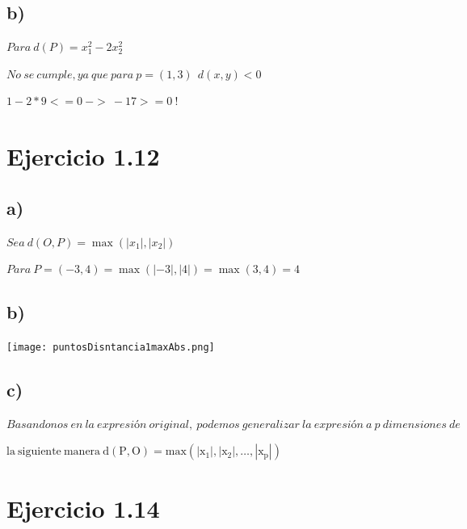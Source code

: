 \documentclass[
]{article}
\begin{document}
\hypertarget{b-4}{%
\subsection{b)}\label{b-4}}

\(Para\ d(P)=x^2_1-2x_2^2\ \)

\(No\ se\ cumple,ya\ que\ para\ p=\left(1,3\right)\ \ d\left(x,y\right)<0\)

\(1-2\ast9<=0 \  ->\  -17>=0\ !\)

\hypertarget{ejercicio-1.12}{%
\section{Ejercicio 1.12}\label{ejercicio-1.12}}

\hypertarget{a-5}{%
\subsection{a)}\label{a-5}}

\(Sea\ d\left(O,P\right)=\max{\left(\left|x_1\right|,\left|x_2\right|\right)}\)

\(Para\ P=\left(-3,4\right)=\max{\left(\left|-3\right|,\left|4\right|\right)}=\max{\left(3,4\right)}=4\)

\hypertarget{b-5}{%
\subsection{b)}\label{b-5}}

\texttt{[image: puntosDisntancia1maxAbs.png]}

\hypertarget{c-2}{%
\subsection{c)}\label{c-2}}

\(Basandonos\ en\ la\ expresión\ original,\ podemos\ generalizar\ la\ expresión\ a\ p\ dimensiones\ de\ \)

\(\mathrm{la\ siguiente\ manera\ d}\left(\mathrm{P,O}\right)\mathrm{\mathrm{=}}\mathrm{max}{\left(\left|\mathrm{x}_\mathrm{1}\right|\mathrm{,} \left|\mathrm{x}_\mathrm{2}\right|\mathrm{,\ldots,} \left|\mathrm{x}_\mathrm{p}\right|\right)}\)

\hypertarget{ejercicio-1.14}{%
\section{Ejercicio 1.14}\label{ejercicio-1.14}}
\end{document}
